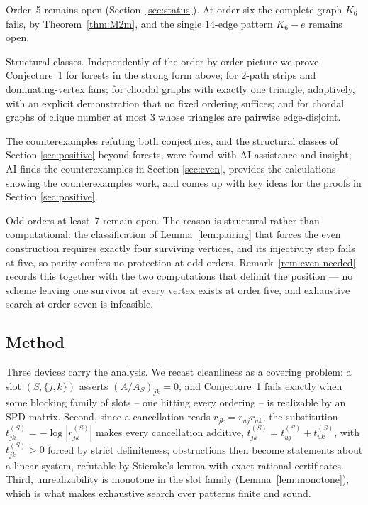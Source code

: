 \documentclass[11pt]{article}
\theoremstyle{plain}
\theoremstyle{definition}
\begin{document}
\begin{humanblock}
Order~5 remains open (Section~\ref{sec:status}). At order six the complete graph $K_6$ fails, by Theorem~\ref{thm:M2m}, and the single $14$-edge pattern $K_6-e$ remains open.

Structural classes. Independently of the order-by-order picture we prove Conjecture~1 for forests in the strong form above; for 2-path strips and dominating-vertex fans; for chordal graphs with exactly one triangle, adaptively, with an explicit demonstration that no fixed ordering suffices; and for chordal graphs of clique number at most $3$ whose triangles are pairwise edge-disjoint.

  The counterexamples refuting both conjectures, and the structural classes of Section \ref{sec:positive} beyond forests, were found with AI assistance and insight; AI finds the counterexamples in Section \ref{sec:even}, provides the calculations showing the counterexamples work, and comes up with key ideas for the proofs in Section \ref{sec:positive}. 

Odd orders at least~7 remain open. The reason is structural rather than computational: the
classification of Lemma~\ref{lem:pairing} that forces the even construction requires exactly four
surviving vertices, and its injectivity step fails at five, so parity confers no protection at odd
orders. Remark~\ref{rem:even-needed} records this together with the two computations that delimit the
position --- no scheme leaving one survivor at every vertex exists at order five, and exhaustive
search at order seven is infeasible.

\subsection{Method}

Three devices carry the analysis. We recast cleanliness as a covering problem: a slot $(S, \{j,k\})$ asserts $(A/A_S)_{jk} = 0$, and Conjecture~1 fails exactly when some blocking family of slots -- one hitting every ordering -- is realizable by an SPD matrix. Second, since a cancellation reads $r_{jk} = r_{uj}r_{uk}$, the substitution $t^{(S)}_{jk} = -\log|r^{(S)}_{jk}|$ makes every cancellation additive, $t^{(S)}_{jk} = t^{(S)}_{uj} + t^{(S)}_{uk}$, with $t^{(S)}_{jk}>0$ forced by strict definiteness; obstructions then become statements about a linear system, refutable by Stiemke's lemma \cite{Stiemke,Gordan} with exact rational certificates. Third, unrealizability is monotone in the slot family (Lemma~\ref{lem:monotone}), which is what makes exhaustive search over patterns finite and sound.


\end{humanblock}
\end{document}
